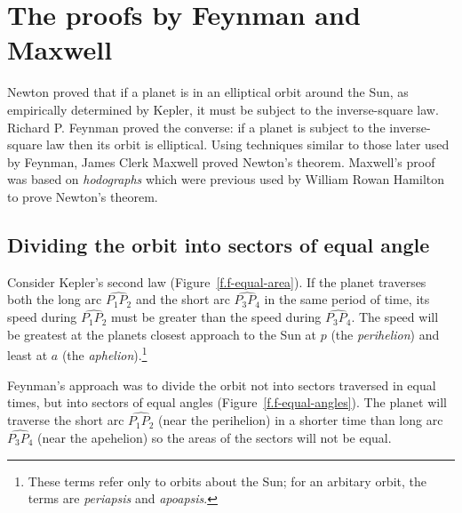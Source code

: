 
\chapter{The proofs by Feynman and Maxwell}\label{s.feynman}

Newton proved that if a planet is in an elliptical orbit around the Sun, as empirically determined by Kepler, it must be subject to the inverse-square law. Richard P. Feynman proved the converse: if a planet is subject to the inverse-square law then its orbit is elliptical. Using techniques similar to those later used by Feynman, James Clerk Maxwell proved Newton's theorem. Maxwell's proof was based on \emph{hodographs} which were previous used by William Rowan Hamilton to prove Newton's theorem.

\section{Dividing the orbit into sectors of equal angle}

Consider Kepler's second law (Figure~\ref{f.f-equal-area}). If the planet traverses both the long arc $\widehat{P_1P_2}$ and the short arc $\widehat{P_3P_4}$ in the same period of time, its speed during $\widehat{P_1P_2}$ must be greater than the speed during $\widehat{P_3P_4}$. The speed will be greatest at the planets closest approach to the Sun at $p$ (the \emph{perihelion}) and least at $a$ (the \emph{aphelion}).\footnote{These terms refer only to orbits about the Sun; for an arbitary orbit, the terms are \emph{periapsis} and \emph{apoapsis}.}

Feynman's approach was to divide the orbit not into sectors traversed in equal times, but into sectors of equal angles (Figure~\ref{f.f-equal-angles}). The planet will traverse the short arc $\widehat{P_1P_2}$ (near the perihelion) in a shorter time than long arc $\widehat{P_3P_4}$ (near the apehelion) so the areas of the sectors will not be equal.


